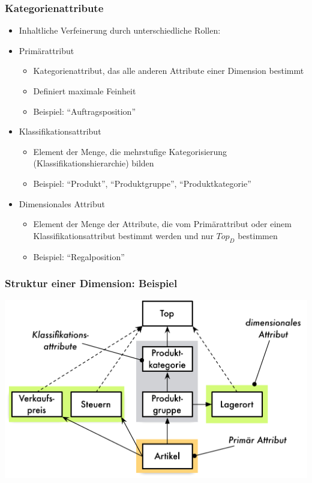         \begin{frame}

        \frametitle{Kategorienattribute}
        \begin{itemize}
        \item Inhaltliche Verfeinerung durch unterschiedliche Rollen:
        \item Primärattribut
          \begin{itemize}
          \item Kategorienattribut, das alle anderen Attribute einer Dimension
            bestimmt
          \item Definiert maximale Feinheit
          \item Beispiel: "`Auftragsposition"'
        \end{itemize}
        \item Klassifikationsattribut
          \begin{itemize}
          \item Element der Menge, die mehrstufige Kategorisierung
            (Klassifikationshierarchie) bilden
          \item Beispiel: "`Produkt"', "`Produktgruppe"', "`Produktkategorie"'
        \end{itemize}
        \item Dimensionales Attribut
          \begin{itemize}
          \item Element der Menge der Attribute, die vom Primärattribut oder
            einem Klassifikationsattribut bestimmt werden und nur $Top_D$
            bestimmen
          \item Beispiel: "`Regalposition"'
        \end{itemize}
        \end{itemize}

        \end{frame}

        \begin{frame}

        \frametitle{Struktur einer Dimension: Beispiel}

        \begin{center}
        \includegraphics[scale=.6]{fig6/Dimensionsstruktur.pdf}
        \end{center}
        \end{frame}

